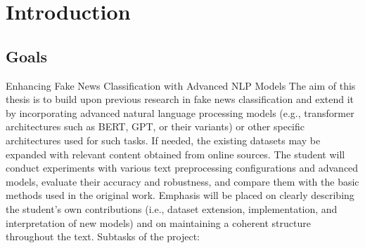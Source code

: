 
\chapter{Introduction}

\setcounter{page}{1}


\begin{chapterabstract}

\lipsum[4]

\end{chapterabstract}


\lipsum[4]

\section{Goals}


Enhancing Fake News Classification with Advanced NLP Models
The aim of this thesis is to build upon previous research in fake news classification and extend it by incorporating advanced natural language processing models (e.g., transformer architectures such as BERT, GPT, or their variants) or other specific architectures used for such tasks. If needed, the existing datasets may be expanded with relevant content obtained from online sources. The student will conduct experiments with various text preprocessing configurations and advanced models, evaluate their accuracy and robustness, and compare them with the basic methods used in the original work. Emphasis will be placed on clearly describing the student’s own contributions (i.e., dataset extension, implementation, and interpretation of new models) and on maintaining a coherent structure throughout the text. Subtasks of the project:

